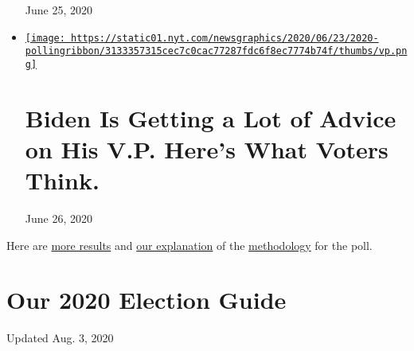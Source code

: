 \begin{itemize}
  June 25, 2020
\item
  \href{https://www.nytimes.com/2020/06/26/us/politics/biden-vice-president-voters.html}{\texttt{[image: https://static01.nyt.com/newsgraphics/2020/06/23/2020-pollingribbon/3133357315cec7c0cac77287fdc6f8ec7774b74f/thumbs/vp.png]}}

  \href{https://www.nytimes.com/2020/06/26/us/politics/biden-vice-president-voters.html}{}

  \hypertarget{biden-is-getting-a-lot-of-advice-on-his-vp-heres-what-voters-think}{%
  \section{Biden Is Getting a Lot of Advice on His V.P. Here's What
  Voters
  Think.}\label{biden-is-getting-a-lot-of-advice-on-his-vp-heres-what-voters-think}}

  June 26, 2020
\end{itemize}

Here are
\href{https://int.nyt.com/data/documenttools/crosstabs0624release/18307fed6cb2dc5a/full.pdf}{more
results} and
\href{https://www.nytimes.com/2020/06/23/upshot/poll-2020-election-method.html}{our
explanation} of the
\href{https://int.nyt.com/data/documenttools/nyt-siena-poll-methodology-june-2020/f6f533b4d07f4cbe/full.pdf}{methodology}
for the poll.

\hypertarget{our-2020-election-guide}{%
\section{Our 2020 Election Guide}\label{our-2020-election-guide}}

Updated Aug. 3, 2020

